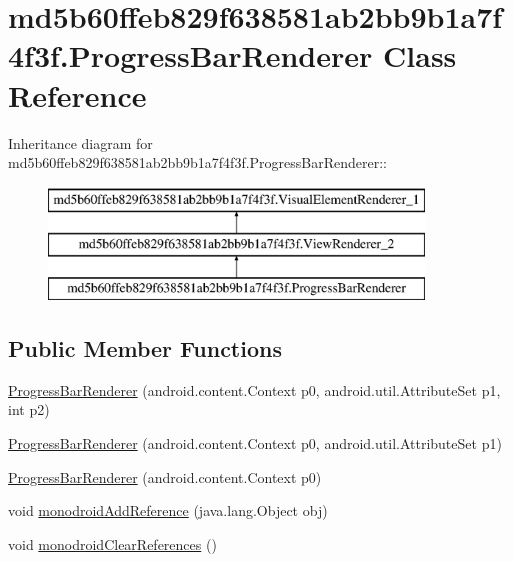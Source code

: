 \hypertarget{classmd5b60ffeb829f638581ab2bb9b1a7f4f3f_1_1_progress_bar_renderer}{
\section{md5b60ffeb829f638581ab2bb9b1a7f4f3f.ProgressBarRenderer Class Reference}
\label{classmd5b60ffeb829f638581ab2bb9b1a7f4f3f_1_1_progress_bar_renderer}
}
Inheritance diagram for md5b60ffeb829f638581ab2bb9b1a7f4f3f.ProgressBarRenderer::\begin{figure}[H]
\begin{center}
\leavevmode
\includegraphics[height=3cm]{classmd5b60ffeb829f638581ab2bb9b1a7f4f3f_1_1_progress_bar_renderer}
\end{center}
\end{figure}
\subsection*{Public Member Functions}
\begin{CompactItemize}
\item 
\hyperlink{classmd5b60ffeb829f638581ab2bb9b1a7f4f3f_1_1_progress_bar_renderer_941a4c014f87f9892f1b14f44446d83e}{ProgressBarRenderer} (android.content.Context p0, android.util.AttributeSet p1, int p2)
\item 
\hyperlink{classmd5b60ffeb829f638581ab2bb9b1a7f4f3f_1_1_progress_bar_renderer_52dcb02f00d412da68b7ca790ffb2956}{ProgressBarRenderer} (android.content.Context p0, android.util.AttributeSet p1)
\item 
\hyperlink{classmd5b60ffeb829f638581ab2bb9b1a7f4f3f_1_1_progress_bar_renderer_376f162b961385dc3a452ce65fe97037}{ProgressBarRenderer} (android.content.Context p0)
\item 
void \hyperlink{classmd5b60ffeb829f638581ab2bb9b1a7f4f3f_1_1_progress_bar_renderer_202f5798a458806f96e04ca5e9dffe33}{monodroidAddReference} (java.lang.Object obj)
\item 
void \hyperlink{classmd5b60ffeb829f638581ab2bb9b1a7f4f3f_1_1_progress_bar_renderer_c94ee2b4c29a46b82c4caf81da54a9bc}{monodroidClearReferences} ()
\end{CompactItemize}
